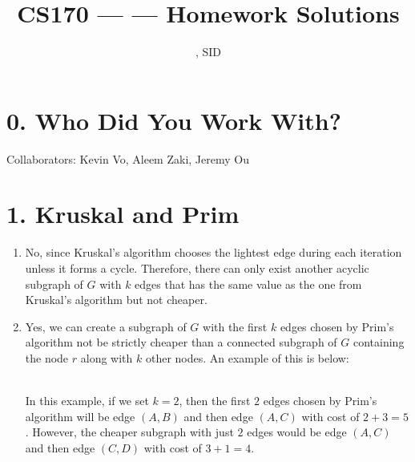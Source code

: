 \documentclass[11pt]{article}
\title{CS170 --- \Session --- Homework \Homework \space Solutions}
\author{\Name, SID \SID}
\date{}
\begin{document}
\maketitle

\section*{0. Who Did You Work With?}

Collaborators: Kevin Vo, Aleem Zaki, Jeremy Ou



\newpage
\section*{1. Kruskal and Prim}
\begin{enumerate}[label=(\alph*)]
\item
No, since Kruskal's algorithm chooses the lightest edge during each iteration unless it forms a cycle. Therefore, there can only exist another acyclic subgraph of $G$ with $k$ edges that has the same value as the one from Kruskal's algorithm but not cheaper.

\item
Yes, we can create a subgraph of $G$ with the first $k$ edges chosen by Prim's algorithm not be strictly cheaper than a connected subgraph of $G$ containing the node $r$ along with $k$ other nodes. An example of this is below:
\\
\\
In this example, if we set $k = 2$, then the first $2$ edges chosen by Prim's algorithm will be edge $(A, B)$ and then edge $(A, C)$ with cost of $2 + 3 = 5$. However, the cheaper subgraph with just $2$ edges would be edge $(A, C)$ and then edge $(C, D)$ with cost of $3 + 1 = 4$.
\end{enumerate}


\newpage
\end{document}
